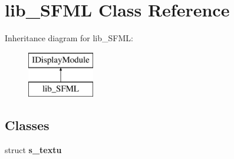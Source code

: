 \section{lib\+\_\+\+S\+F\+ML Class Reference}
\label{classlib___s_f_m_l}
Inheritance diagram for lib\+\_\+\+S\+F\+ML\+:\begin{figure}[H]
\begin{center}
\leavevmode
\includegraphics[height=2.000000cm]{classlib___s_f_m_l}
\end{center}
\end{figure}
\subsection*{Classes}
\begin{DoxyCompactItemize}
\item 
struct \textbf{ s\+\_\+textu}
\end{DoxyCompactItemize}
